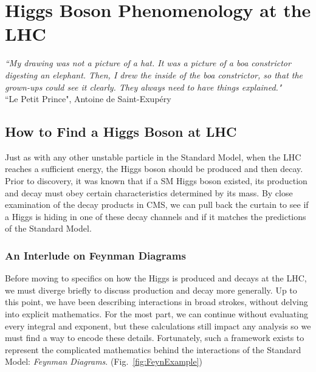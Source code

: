 \chapter{Higgs Boson Phenomenology at the LHC}
\label{sec:pheno}

\begin{center}
\begin{footnotesize}
{\it{``My drawing was not a picture of a hat. It was a picture of a boa constrictor digesting an elephant. Then, I drew the inside of the boa constrictor, so that the grown-ups could see it clearly. They always need to have things explained."}}\\
``Le Petit Prince", Antoine de Saint-Exup\'ery
\end{footnotesize}
\end{center}

\section{How to Find a Higgs Boson at LHC}
\label{sec:LHCHiggs}

Just as with any other unstable particle in the Standard Model, when the LHC reaches a sufficient energy, the Higgs boson should be produced and then decay. Prior to discovery, it was known that if a SM Higgs boson existed, its production and decay must obey certain characteristics determined by its mass. By close examination of the decay products in CMS, we can pull back the curtain to see if a Higgs is hiding in one of these decay channels and if it matches the predictions of the Standard Model.

\subsection{An Interlude on Feynman Diagrams}
\label{sec:FeynDiagrams}

Before moving to specifics on how the Higgs is produced and decays at the LHC, we must diverge briefly to discuss production and decay more generally. Up to this point, we have been describing interactions in broad strokes, without delving into explicit mathematics. For the most part, we can continue without evaluating every integral and exponent, but these calculations still impact any analysis so we must find a way to encode these details. Fortunately, such a framework exists to represent the complicated mathematics behind the interactions of the Standard Model: \textit{Feynman Diagrams}. (Fig.~\ref{fig:FeynExample})

